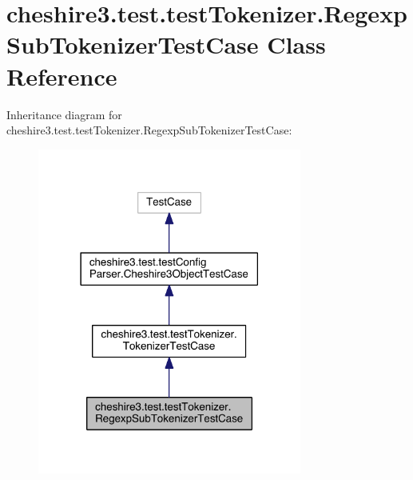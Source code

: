 \hypertarget{classcheshire3_1_1test_1_1test_tokenizer_1_1_regexp_sub_tokenizer_test_case}{\section{cheshire3.\-test.\-test\-Tokenizer.\-Regexp\-Sub\-Tokenizer\-Test\-Case Class Reference}
\label{classcheshire3_1_1test_1_1test_tokenizer_1_1_regexp_sub_tokenizer_test_case}
}


Inheritance diagram for cheshire3.\-test.\-test\-Tokenizer.\-Regexp\-Sub\-Tokenizer\-Test\-Case\-:
\nopagebreak
\begin{figure}[H]
\begin{center}
\leavevmode
\includegraphics[width=246pt]{classcheshire3_1_1test_1_1test_tokenizer_1_1_regexp_sub_tokenizer_test_case__inherit__graph}
\end{center}
\end{figure}



